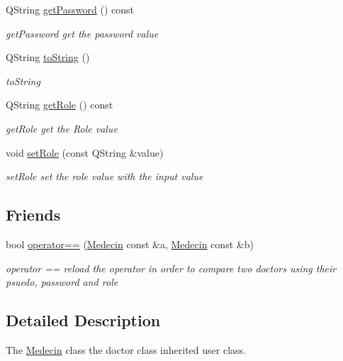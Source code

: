 \begin{DoxyCompactItemize}
Q\+String \mbox{\hyperlink{class_medecin_a0ea82c3c050b017689dc55d2f2de73b8}{get\+Password}} () const
\begin{DoxyCompactList}\small\item\em get\+Password get the password value \end{DoxyCompactList}\item 
Q\+String \mbox{\hyperlink{class_medecin_ae009584f0888a6d2d368f61dc768e192}{to\+String}} ()
\begin{DoxyCompactList}\small\item\em to\+String \end{DoxyCompactList}\item 
Q\+String \mbox{\hyperlink{class_medecin_a10a0e712d72febbe4a509e277cea94bf}{get\+Role}} () const
\begin{DoxyCompactList}\small\item\em get\+Role get the Role value \end{DoxyCompactList}\item 
void \mbox{\hyperlink{class_medecin_ae98a1e8b43f23aeaf151e300e568c43f}{set\+Role}} (const Q\+String \&value)
\begin{DoxyCompactList}\small\item\em set\+Role set the role value with the input value \end{DoxyCompactList}\end{DoxyCompactItemize}
\subsection*{Friends}
\begin{DoxyCompactItemize}
\item 
bool \mbox{\hyperlink{class_medecin_ab809729def57ace90c0e2cd31232d18c}{operator==}} (\mbox{\hyperlink{class_medecin}{Medecin}} const \&a, \mbox{\hyperlink{class_medecin}{Medecin}} const \&b)
\begin{DoxyCompactList}\small\item\em operator == reload the operator in order to compare two doctors using their psuedo, password and role \end{DoxyCompactList}\end{DoxyCompactItemize}


\subsection{Detailed Description}
The \mbox{\hyperlink{class_medecin}{Medecin}} class the doctor class inherited user class. 

